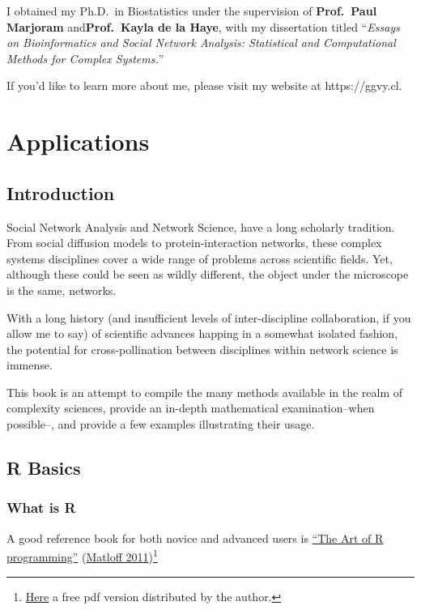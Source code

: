 \documentclass[
]{book}
\begin{document}
I obtained my Ph.D.~in Biostatistics under the supervision of \textbf{Prof.~Paul Marjoram} and\textbf{Prof.~Kayla de la Haye}, with my dissertation titled ``\emph{Essays on Bioinformatics and Social Network Analysis: Statistical and Computational Methods for Complex Systems.}''

If you'd like to learn more about me, please visit my website at https://ggvy.cl.

\hypertarget{part-applications}{%
\part{Applications}\label{part-applications}}

\hypertarget{introduction}{%
\chapter{Introduction}\label{introduction}}

Social Network Analysis and Network Science, have a long scholarly tradition.
From social diffusion models to protein-interaction networks, these complex systems disciplines cover a wide range of problems across scientific fields. Yet, although these could be seen as wildly different, the object under the microscope is the same, networks.

With a long history (and insufficient levels of inter-discipline collaboration, if you allow me to say) of scientific advances happing in a somewhat isolated fashion, the potential for cross-pollination between disciplines within network science is immense.

This book is an attempt to compile the many methods available in the realm of complexity sciences, provide an in-depth mathematical examination--when possible--, and provide a few examples illustrating their usage.

\hypertarget{r-basics}{%
\chapter{R Basics}\label{r-basics}}

\hypertarget{what-is-r}{%
\section{What is R}\label{what-is-r}}

A good reference book for both novice and advanced users is \href{https://nostarch.com/artofr.htm}{``The Art of R programming''}
(\protect\hyperlink{ref-Matloff2011}{Matloff 2011})\footnote{\href{http://heather.cs.ucdavis.edu/~matloff/145/PLN/RMaterials/NSPpart.pdf}{Here} a free pdf version distributed by the author.}
\end{document}
